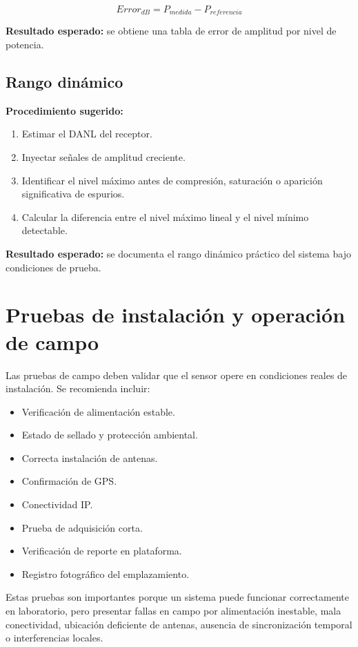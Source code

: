 \[
Error_{dB} = P_{medida} - P_{referencia}
\]

\textbf{Resultado esperado:} se obtiene una tabla de error de amplitud por nivel de potencia.

\subsection{Rango dinámico}

\textbf{Procedimiento sugerido:}

\begin{enumerate}
    \item Estimar el DANL del receptor.
    \item Inyectar señales de amplitud creciente.
    \item Identificar el nivel máximo antes de compresión, saturación o aparición significativa de espurios.
    \item Calcular la diferencia entre el nivel máximo lineal y el nivel mínimo detectable.
\end{enumerate}

\textbf{Resultado esperado:} se documenta el rango dinámico práctico del sistema bajo condiciones de prueba.

\section{Pruebas de instalación y operación de campo}

Las pruebas de campo deben validar que el sensor opere en condiciones reales de instalación. Se recomienda incluir:

\begin{itemize}
    \item Verificación de alimentación estable.
    \item Estado de sellado y protección ambiental.
    \item Correcta instalación de antenas.
    \item Confirmación de GPS.
    \item Conectividad IP.
    \item Prueba de adquisición corta.
    \item Verificación de reporte en plataforma.
    \item Registro fotográfico del emplazamiento.
\end{itemize}

Estas pruebas son importantes porque un sistema puede funcionar correctamente en laboratorio, pero presentar fallas en campo por alimentación inestable, mala conectividad, ubicación deficiente de antenas, ausencia de sincronización temporal o interferencias locales.


